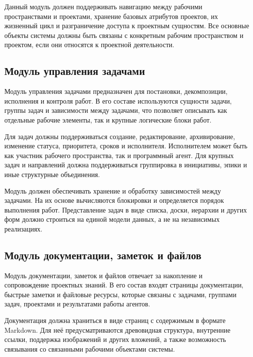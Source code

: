 Данный модуль должен поддерживать навигацию между рабочими пространствами и проектами, хранение базовых атрибутов проектов, их жизненный цикл и разграничение доступа к проектным сущностям. Все основные объекты системы должны быть связаны с конкретным рабочим пространством и проектом, если они относятся к проектной деятельности.

\textheadingsep
\subsection{Модуль управления задачами}

\headingtextsep

Модуль управления задачами предназначен для постановки, декомпозиции, исполнения и контроля работ. В его составе используются сущности задачи, группы задач и зависимости между задачами, что позволяет описывать как отдельные рабочие элементы, так и крупные логические блоки работ.

Для задач должны поддерживаться создание, редактирование, архивирование, изменение статуса, приоритета, сроков и исполнителя. Исполнителем может быть как участник рабочего пространства, так и программный агент. Для крупных задач и направлений должна поддерживаться группировка в инициативы, эпики и иные структурные объединения.

Модуль должен обеспечивать хранение и обработку зависимостей между задачами. На их основе вычисляются блокировки и определяется порядок выполнения работ. Представление задач в виде списка, доски, иерархии и других форм должно строиться на единой модели данных, а не на независимых реализациях.

\textheadingsep
\subsection{Модуль документации, заметок и файлов}

\headingtextsep

Модуль документации, заметок и файлов отвечает за накопление и сопровождение проектных знаний. В его состав входят страницы документации, быстрые заметки и файловые ресурсы, которые связаны с задачами, группами задач, проектами и результатами работы агентов.

Документация должна храниться в виде страниц с содержимым в формате Markdown. Для неё предусматриваются древовидная структура, внутренние ссылки, поддержка изображений и других вложений, а также возможность связывания со связанными рабочими объектами системы.

